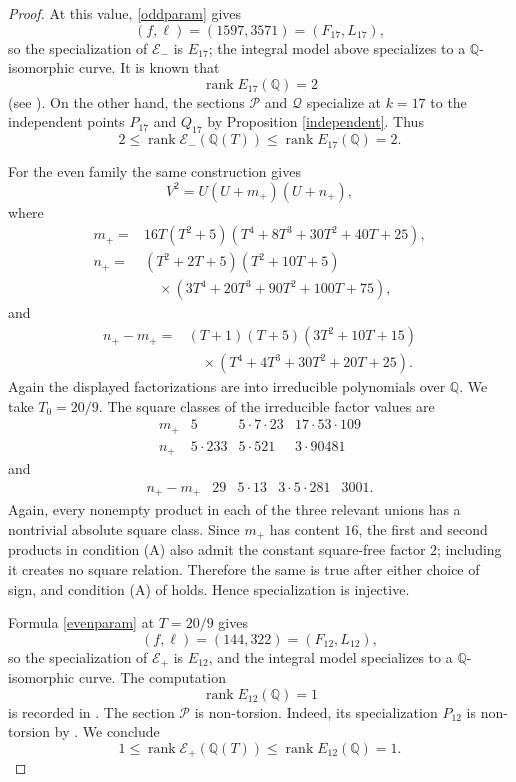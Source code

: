 \documentclass[11pt]{amsart}
\theoremstyle{remark}
\newcommand{\Q}{\mathbb{Q}}
\begin{document}
\begin{proof}
At this value, \eqref{oddparam} gives
\[
 (f,\ell)=(1597,3571)=(F_{17},L_{17}),
\]
so the specialization of $\mathcal E_-$ is $E_{17}$; the integral model
above specializes to a $\Q$-isomorphic curve.  It is known that
\[
 \operatorname{rank}E_{17}(\Q)=2
\]
(see \cite[Section 5]{DujellaMT}).  On the other hand, the sections
$\mathcal P$ and $\mathcal Q$ specialize at $k=17$ to the independent
points $P_{17}$ and $Q_{17}$ by Proposition \ref{independent}.  Thus
\[
 2\leq\operatorname{rank}\mathcal E_-(\Q(T))
 \leq\operatorname{rank}E_{17}(\Q)=2.
\]

For the even family the same construction gives
\[
 V^2=U(U+m_+)(U+n_+),
\]
where
\begin{align*}
m_+={}&16T(T^2+5)
 (T^4+8T^3+30T^2+40T+25),\\
n_+={}&(T^2+2T+5)(T^2+10T+5)\\
&\quad{}\times(3T^4+20T^3+90T^2+100T+75),
\end{align*}
and
\begin{align*}
n_+-m_+={}&(T+1)(T+5)(3T^2+10T+15)\\
&\quad{}\times(T^4+4T^3+30T^2+20T+25).
\end{align*}
Again the displayed factorizations are into irreducible polynomials over
$\Q$.  We take $T_0=20/9$.  The square classes of the irreducible factor
values are
\[
\begin{array}{c|ccc}
m_+&
5&5\cdot7\cdot23&17\cdot53\cdot109\\[1mm]
n_+&
5\cdot233&5\cdot521&3\cdot90481
\end{array}
\]
and
\[
\begin{array}{c|cccc}
n_+-m_+&
29&5\cdot13&3\cdot5\cdot281&3001.
\end{array}
\]
Again, every nonempty product in each of the three relevant unions
has a nontrivial absolute square class.  Since $m_+$ has content $16$,
the first and second products in condition (A) also admit the constant
square-free factor $2$; including it creates no square relation.
Therefore the same is true after either choice of sign, and condition
(A) of \cite{GusicTadic} holds.  Hence specialization is injective.

Formula \eqref{evenparam} at $T=20/9$ gives
\[
 (f,\ell)=(144,322)=(F_{12},L_{12}),
\]
so the specialization of $\mathcal E_+$ is $E_{12}$, and the integral
model specializes to a $\Q$-isomorphic curve.  The computation
\[
 \operatorname{rank}E_{12}(\Q)=1
\]
is recorded in \cite[Section 5]{DujellaMT}.  The section $\mathcal P$ is non-torsion.  Indeed, its specialization
$P_{12}$ is non-torsion by \cite[Theorem 3 and Remark 4]{DujellaMT}.
We conclude
\[
 1\leq\operatorname{rank}\mathcal E_+(\Q(T))
 \leq\operatorname{rank}E_{12}(\Q)=1.
\]
\end{proof}
\end{document}
